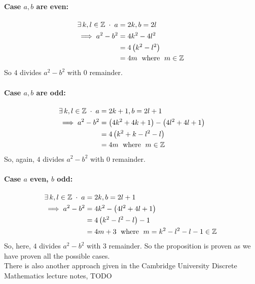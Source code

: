 \documentclass[MathsNotesBase.tex]{subfiles}
\begin{document}
{			\paragraph{Case $a, b$ are even:}
			\begin{align*}
			\exists\,k,l \in \mathbb{Z}^{\;} \cdot \;a &= 2k, b = 2l \\
			\implies a^2 - b^2 &= 4k^2 - 4l^2 \\
			&= 4\left(k^2 - l^2\right) \\
			&= 4m\; \text{ where } \;m \in \mathbb{Z}^{\;}  \\
			\end{align*}
			So $4$ divides $a^2 - b^2$ with $0$ remainder.
			\paragraph{Case $a, b$ are odd:}
			\begin{align*}
			\exists\,k,l \in \mathbb{Z}^{\;} \cdot \;a &= 2k+1, b = 2l+1 \\
			\implies a^2 - b^2 &= \left(4k^2 + 4k + 1\right) - \left(4l^2 + 4l + 1\right) \\
			&= 4\left(k^2 + k - l^2 - l\right) \\
			&= 4m\; \text{ where } \;m \in \mathbb{Z}^{\;}  \\
			\end{align*}
			So, again, $4$ divides $a^2 - b^2$ with $0$ remainder.
			\paragraph{Case $a$ even, $b$ odd:}
			\begin{align*}
			\exists\,k,l \in \mathbb{Z}^{\;} \cdot \;a &= 2k, b = 2l+1 \\
			\implies a^2 - b^2 &= 4k^2 - \left(4l^2 + 4l + 1\right) \\
			&= 4\left(k^2 - l^2 - l\right) - 1 \\
			&= 4m + 3\; \text{ where } \;m=k^2 - l^2 - l - 1 \in \mathbb{Z}^{\;}  \\
			\end{align*}
			So, here, $4$ divides $a^2 - b^2$ with $3$ remainder. So the proposition is proven as we have proven all the possible cases.\\
			There is also another approach given in the Cambridge University Discrete Mathematics lecture notes,
			TODO
		}
		
\end{document}
